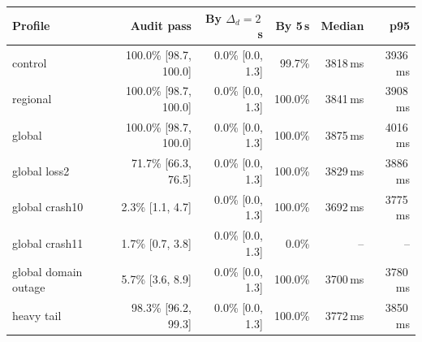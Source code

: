 \begin{tabular}{@{}lrrrrr@{}}
\toprule
Profile & Audit pass & By $\Delta_d=2$\,s & By 5\,s & Median & p95\\
\midrule
control & 100.0\% [98.7, 100.0] & 0.0\% [0.0, 1.3] & 99.7\% & 3818\,ms & 3936\,ms\\
regional & 100.0\% [98.7, 100.0] & 0.0\% [0.0, 1.3] & 100.0\% & 3841\,ms & 3908\,ms\\
global & 100.0\% [98.7, 100.0] & 0.0\% [0.0, 1.3] & 100.0\% & 3875\,ms & 4016\,ms\\
global loss2 & 71.7\% [66.3, 76.5] & 0.0\% [0.0, 1.3] & 100.0\% & 3829\,ms & 3886\,ms\\
global crash10 & 2.3\% [1.1, 4.7] & 0.0\% [0.0, 1.3] & 100.0\% & 3692\,ms & 3775\,ms\\
global crash11 & 1.7\% [0.7, 3.8] & 0.0\% [0.0, 1.3] & 0.0\% & -- & --\\
global domain outage & 5.7\% [3.6, 8.9] & 0.0\% [0.0, 1.3] & 100.0\% & 3700\,ms & 3780\,ms\\
heavy tail & 98.3\% [96.2, 99.3] & 0.0\% [0.0, 1.3] & 100.0\% & 3772\,ms & 3850\,ms\\
\bottomrule
\end{tabular}

